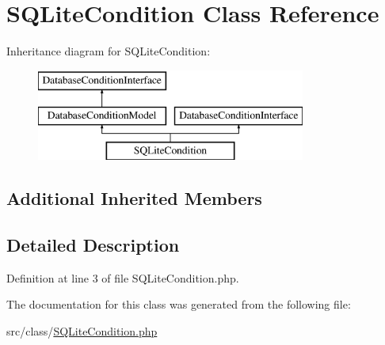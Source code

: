 \hypertarget{class_s_q_lite_condition}{}\section{S\+Q\+Lite\+Condition Class Reference}
\label{class_s_q_lite_condition}
Inheritance diagram for S\+Q\+Lite\+Condition\+:\begin{figure}[H]
\begin{center}
\leavevmode
\includegraphics[height=3.000000cm]{class_s_q_lite_condition}
\end{center}
\end{figure}
\subsection*{Additional Inherited Members}


\subsection{Detailed Description}


Definition at line 3 of file S\+Q\+Lite\+Condition.\+php.



The documentation for this class was generated from the following file\+:\begin{DoxyCompactItemize}
\item 
src/class/\hyperlink{_s_q_lite_condition_8php}{S\+Q\+Lite\+Condition.\+php}\end{DoxyCompactItemize}
